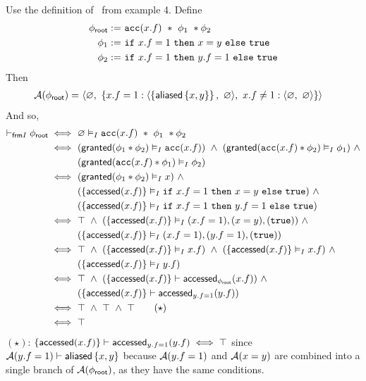 Use the definition of \List \ from example 4. Define
\begin{align*}
{\phi_\textsf{root}} := & \ \texttt{acc}(x.f) \ \ast \ \phi_1 \ \ast \phi_2
\\
\phi_1 := & \ \texttt{if} \ x.f = 1 \ \texttt{then} \ x = y   \ \texttt{else} \ \texttt{true}
\\
\phi_2 := & \ \texttt{if} \ x.f = 1 \ \texttt{then} \ y.f = 1 \ \texttt{else} \ \texttt{true}
\end{align*}
Then
\begin{align*}
\mathcal{A}({\phi_\textsf{root}}) = & \
\langle  \varnothing  ,\  \left\{ 
    x.f = 1    : \langle \left\{ \textsf{aliased}\left\{ x,y \right\} \right\} ,\ \varnothing \rangle ,\
    x.f \neq 1 : \langle \varnothing ,\ \varnothing \rangle
   \right\}  \rangle
\end{align*}
And so,
\begin{align*}
\vdash_{\textsf{frm}I} {\phi_\textsf{root}}
\iff & \
\varnothing \vDash_I
\texttt{acc}(x.f) \ \ast \ \phi_1 \ \ast \phi_2
\\ \iff & \
( \textsf{granted}(\phi_1 \ast \phi_2) \vDash_I \texttt{acc}(x.f) ) \ \land \
( \textsf{granted}(\texttt{acc}(x.f) \ast \phi_2) \vDash_I \phi_1 ) \ \land \\ & \
( \textsf{granted}(\texttt{acc}(x.f) \ast \phi_1) \vDash_I \phi_2 )
\\ \iff & \
( \textsf{granted}(\phi_1 \ast \phi_2) \vDash_I x ) \ \land \\ & \
( \left\{ \textsf{accessed}(x.f) \right\} \vDash_I \texttt{if} \ x.f = 1 \ \texttt{then} \ x = y   \ \texttt{else} \ \texttt{true} ) \ \land \\ & \
( \left\{ \textsf{accessed}(x.f) \right\} \vDash_I \texttt{if} \ x.f = 1 \ \texttt{then} \ y.f = 1 \ \texttt{else} \ \texttt{true} )
\\ \iff & \
\top \ \land \
( \left\{ \textsf{accessed}(x.f) \right\} \vDash_I (x.f = 1), (x = y), (\texttt{true}) ) \ \land \\ & \
( \left\{ \textsf{accessed}(x.f) \right\} \vDash_I (x.f = 1), (y.f = 1), (\texttt{true}) )
\\ \iff & \
\top \ \land \
( \left\{ \textsf{accessed}(x.f) \right\} \vDash_I x.f ) \ \land \
( \left\{ \textsf{accessed}(x.f) \right\} \vDash_I x.f ) \ \land \\ & \
( \left\{ \textsf{accessed}(x.f) \right\} \vDash_I y.f )
\\ \iff & \
\top \ \land \
( \left\{ \textsf{accessed}(x.f) \right\} \vdash \textsf{accessed}_{\phi_\textsf{root}}(x.f) ) \ \land \\ & \
( \left\{ \textsf{accessed}(x.f) \right\} \vdash \textsf{accessed}_{y.f = 1}(y.f) )
\\ \iff & \
\top \ \land \ \top \ \land \ \top \tag{$\star$}
\\ \iff & \
\top
\end{align*}
$(\star)$: $\left\{ \textsf{accessed}(x.f) \right\} \vdash \textsf{accessed}_{y.f = 1}(y.f) \iff \top$ since $\mathcal{A}(y.f = 1) \vdash \textsf{aliased}\left\{ x,y \right\}$ because $\mathcal{A}(y.f = 1)$ and $\mathcal{A}(x = y)$ are combined into a single branch of $\mathcal{A}({\phi_\textsf{root}})$, as they have the same conditions.

